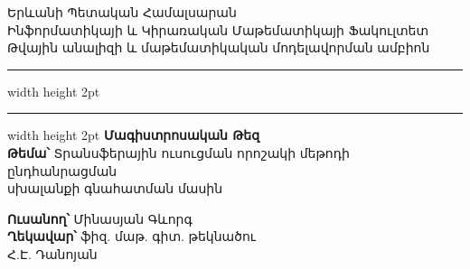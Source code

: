 \documentclass[11pt]{article}
\begin{document}
\newtheorem{theorem}{Թեորեմ}
\newtheorem{lemma}{Լեմմա}
\newtheorem{corollary}{Հետևանք}
\newtheorem{preposition}{Պնդում}
\newtheorem{defination}{Սահմանում}


\theoremstyle{definition} %
\newtheorem{innercustomcase}{Դեպք}
\newenvironment{customcase}[1]
  {\renewcommand\theinnercustomcase{#1}\innercustomcase}
  {\endinnercustomcase}
\newtheorem{case}{Դեպք}

\raggedbottom


\begin{titlepage}

\begin{center}
\large  Երևանի Պետական Համալսարան\\
\large Ինֆորմատիկայի և Կիրառական Մաթեմատիկայի Ֆակուլտետ\\
 Թվային անալիզի և մաթեմատիկական մոդելավորման ամբիոն\\
 \vspace{2mm}
\hrule width \hsize height 2pt  \kern 1mm \hrule width \hsize height 2pt 
\vspace{50mm}
\textbf{\huge Մագիստրոսական Թեզ\\}\noindent \newline \newline
\textbf{\large Թեմա՝}	\hspace{3mm} Տրանսֆերային ուսուցման որոշակի մեթոդի ընդհանրացման \\ սխալանքի գնահատման մասին
\end{center}
\vspace{25mm}
\begin{flushright}
\textbf{\large Ուսանող՝ \hspace{18mm}}			Մինասյան Գևորգ \\
\vspace{4mm}
\textbf{\large Ղեկավար՝ \hspace{2mm}}			ֆիզ. մաթ. գիտ. թեկնածու \\  Հ.Է. Դանոյան
\end{flushright}
\vspace{56mm}
\end{titlepage}
\tableofcontents
\newpage





\section*{\hfill 
 \hfill} \noindent
{}
{}
 
\end{document}
